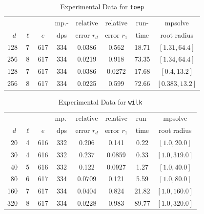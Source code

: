 \documentclass[runningheads]{llncs}
\begin{document}
\begin{table}
\caption{Experimental Data for \texttt{toep}} %
\label{tab:toep}
\vskip -0.15in
\begin{center}
\begin{small}
\begin{sc}
\begin{tabular}{rccccccc}
\toprule
&  &  & mp.-& relative  & relative & run- & mpsolve \\
$d~$& $\ell$& $e$ & dps&error $r_d$       & error $r_1$ &time& root radius\\
\midrule
 128 & 7 & 617 & 334 & 0.0386 & 0.562 & 18.71 & $[1.31, 64.4]$\\
 256 & 8 & 617 & 334 & 0.0219 & 0.918 & 73.35 & $[1.34, 64.4]$\\
 128 & 7 & 617 & 334 & 0.0386 & 0.0272 & 17.68 & $[0.4, 13.2]$\\
 256 & 8 & 617 & 334 & 0.0225 & 0.599 & 72.66 & $[0.383, 13.2]$\\
\bottomrule
\end{tabular}
\end{sc}
\end{small}
\end{center}
\vskip 0.05in
\end{table}


\begin{table}
\caption{Experimental Data for \texttt{wilk}} %
\label{tab:wilk}
\vskip -0.15in
\begin{center}
\begin{small}
\begin{sc}
\begin{tabular}{rccccccc}
\toprule
&  &  & mp.-& relative  & relative & run- & mpsolve \\
$d~$& $\ell$& $e$ & dps&error $r_d$       & error $r_1$ &time& root radius\\
\midrule
 20 & 4 & 616 & 332 & 0.206 & 0.141 & 0.22 & $[1.0, 20.0]$\\
 30 & 4 & 616 & 332 & 0.237 & 0.0859 & 0.33 & $[1.0, 319.0]$\\
 40 & 5 & 616 & 332 & 0.122 & 0.0927 & 1.27 & $[1.0, 40.0]$\\
 80 & 6 & 617 & 334 & 0.0709 & 0.121 & 5.59 & $[1.0, 80.0]$\\
 160 & 7 & 617 & 334 & 0.0404 & 0.824 & 21.82 & $[1.0, 160.0]$\\
 320 & 8 & 617 & 334 & 0.0228 & 0.983 & 89.77 & $[1.0, 320.0]$\\
\bottomrule
\end{tabular}
\end{sc}
\end{small}
\end{center}
\vskip 0.05in
\end{table}
\end{document}
